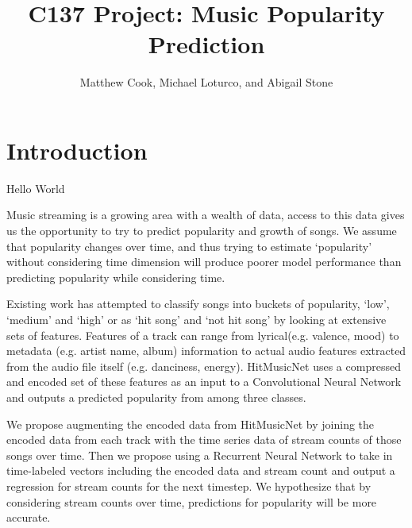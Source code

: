 \documentclass[11pt]{article}
\title{C137 Project: Music Popularity Prediction}
\author{Matthew Cook, Michael Loturco, and Abigail Stone}
\date{}
\begin{document}
\maketitle

\section{Introduction}

Hello World

Music streaming is a growing area with a wealth of data, access to this data gives us the opportunity to try to predict popularity and growth of songs. We assume that popularity changes over time, and thus trying to estimate ‘popularity’ without considering time dimension will produce poorer model performance than predicting popularity while considering time. 


Existing work has attempted to classify songs into buckets of popularity, ‘low’, ‘medium’ and ‘high’ or as ‘hit song’ and ‘not hit song’ by looking at extensive sets of features. Features of a track can range from lyrical(e.g. valence, mood) to metadata (e.g. artist name, album) information to actual audio features extracted from the audio file itself (e.g. danciness, energy). HitMusicNet uses a compressed and encoded set of these features as an input to a Convolutional Neural Network and outputs a predicted popularity from among three classes. 


We propose augmenting the encoded data from HitMusicNet by joining the encoded data from each track with the time series data of stream counts of those songs over time. Then we propose using a Recurrent Neural Network to take in time-labeled vectors including the encoded data and stream count and output a regression for stream counts for the next timestep. We hypothesize that by considering stream counts over time, predictions for popularity will be more accurate. 
\end{document}
